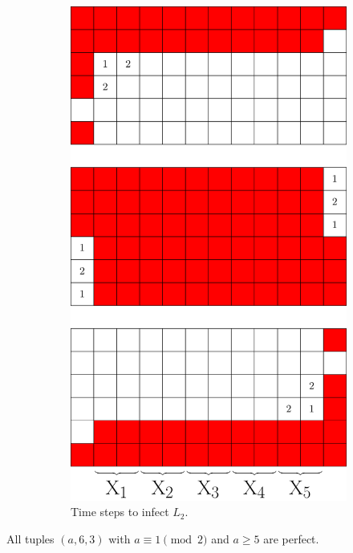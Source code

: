 \begin{figure}[]
\begin{subfigure}{0.2915\textwidth}
\includegraphics[width=\textwidth]{figures/7/6x12x3_L2_numbered_heatmap.pdf}
\caption{Time steps to infect $L_2$.}
\label{fig:6x12x3_timesteps}
\end{subfigure}
\caption{}
\label{fig:}
\end{figure} 

\begin{con}
\label{con:3x6xodd}
All tuples $(a,6,3)$ with $a \equiv 1 \pmod 2$ and $a \geq 5$ are perfect. 
\end{con}

